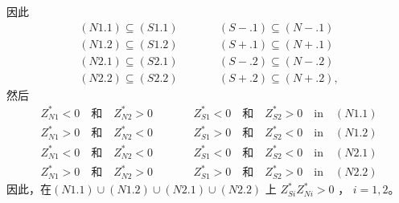 \documentclass[10.0pt]{article}
\begin{document}
因此
\begin{eqnarray*}
(N1.1) \subseteq (S1.1) & \qquad & (S-.1) \subseteq (N-.1) \\
(N1.2) \subseteq (S1.2) & \qquad & (S+.1) \subseteq (N+.1) \\
(N2.1) \subseteq (S2.1) & \qquad & (S-.2) \subseteq (N-.2) \\
(N2.2) \subseteq (S2.2) & \qquad & (S+.2) \subseteq (N+.2), 
\end{eqnarray*}
然后
\begin{eqnarray*}
Z_{N1}^* < 0 \quad \text{和} \quad Z_{N2}^* > 0 \quad & & \quad Z_{S1}^* < 0 \quad \text{和} \quad Z_{S2}^* > 0 \quad \text{in} \quad (N1.1) \\
Z_{N1}^* > 0 \quad \text{和} \quad Z_{N2}^* < 0 \quad & & \quad Z_{S1}^* > 0 \quad \text{和} \quad Z_{S2}^* < 0 \quad \text{in} \quad (N1.2) \\
Z_{N1}^* < 0 \quad \text{和} \quad Z_{N2}^* < 0 \quad & & \quad Z_{S1}^* < 0 \quad \text{和} \quad Z_{S2}^* < 0 \quad \text{in} \quad (N2.1) \\
Z_{N1}^* > 0 \quad \text{和} \quad Z_{N2}^* > 0 \quad & & \quad Z_{S1}^* > 0 \quad \text{和} \quad Z_{S2}^* > 0 \quad \text{in} \quad (N2.2) 
\end{eqnarray*}
因此，在$ (N1.1) \cup (N1.2) \cup (N2.1) \cup (N2.2) $ 上 $ Z_{S i}^* Z_{N i}^* > 0 $ ， $ i = 1, 2 $。
\end{document}
